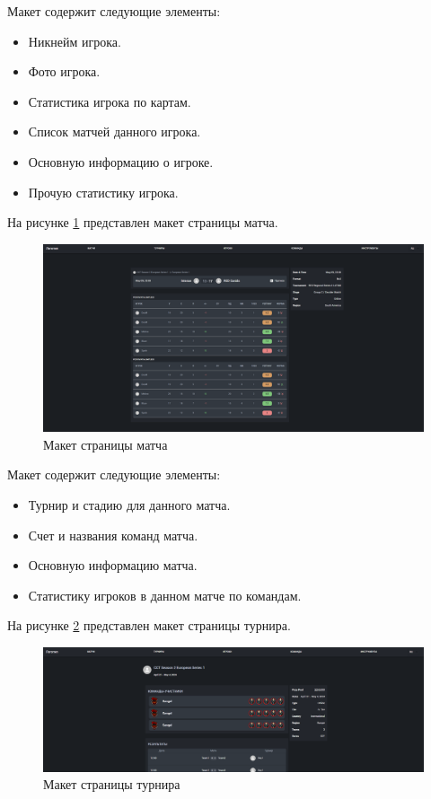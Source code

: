 Макет содержит следующие элементы:
\begin{itemize}
	\item Никнейм игрока.
	\item Фото игрока.
	\item Статистика игрока по картам.
	\item Список матчей данного игрока.
	\item Основную информацию о игроке.
	\item Прочую статистику игрока.
\end{itemize}

На рисунке \ref{fig:-matchPage} представлен макет страницы матча.
\begin{figure}
	\centering
	\includegraphics[width=0.95\linewidth]{"images/Страница матча"}
	\caption{Макет страницы матча}
	\label{fig:-matchPage}
\end{figure}

Макет содержит следующие элементы:
\begin{itemize}
	\item Турнир и стадию для данного матча.
	\item Счет и названия команд матча.
	\item Основную информацию матча.
	\item Статистику игроков в данном матче по командам.
\end{itemize}

На рисунке \ref{fig:-tournamentPage} представлен макет страницы турнира.
\begin{figure}
	\centering
	\includegraphics[width=0.95\linewidth]{"images/Страница турнира"}
	\caption{Макет страницы турнира}
	\label{fig:-tournamentPage}
\end{figure}

